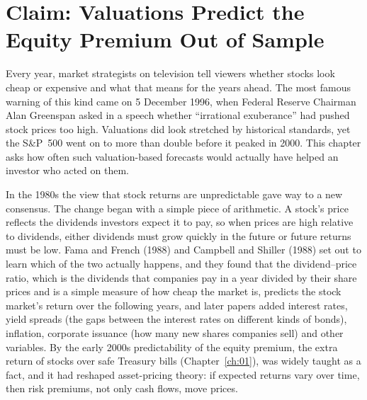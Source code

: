 \makeatletter
\makeatother

\chapter{Claim: Valuations Predict the Equity Premium Out of Sample}
\label{ch:09}

Every year, market strategists on television tell viewers whether stocks look cheap or expensive and what that means for the years ahead. The most famous warning of this kind came on 5 December 1996, when Federal Reserve Chairman Alan Greenspan asked in a speech whether ``irrational exuberance'' had pushed stock prices too high. Valuations did look stretched by historical standards, yet the S\&P~500 went on to more than double before it peaked in 2000. This chapter asks how often such valuation-based forecasts would actually have helped an investor who acted on them.

In the 1980s the view that stock returns are unpredictable gave way to a new consensus. The change began with a simple piece of arithmetic. A stock's price reflects the dividends investors expect it to pay, so when prices are high relative to dividends, either dividends must grow quickly in the future or future returns must be low. Fama and French (1988) and Campbell and Shiller (1988) set out to learn which of the two actually happens, and they found that the dividend--price ratio, which is the dividends that companies pay in a year divided by their share prices and is a simple measure of how cheap the market is, predicts the stock market's return over the following years, and later papers added interest rates, yield spreads (the gaps between the interest rates on different kinds of bonds), inflation, corporate issuance (how many new shares companies sell) and other variables. By the early 2000s predictability of the equity premium, the extra return of stocks over safe Treasury bills (Chapter~\ref{ch:01}), was widely taught as a fact, and it had reshaped asset-pricing theory: if expected returns vary over time, then risk premiums, not only cash flows, move prices.

